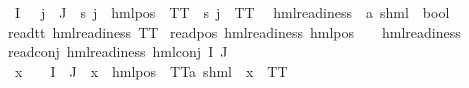 \begin{isabellebody}
\ {\isachardoublequoteopen}I\ {\isacharequal}{\kern0pt}\ {\isacharbraceleft}{\kern0pt}{\isacharbraceright}{\kern0pt}{\isachardoublequoteclose}\ {\isachardoublequoteopen}{\isacharparenleft}{\kern0pt}{\isasymforall}j\ {\isasymin}\ J{\isachardot}{\kern0pt}\ {\isacharparenleft}{\kern0pt}{\isasymexists}{\isasymalpha}{\isachardot}{\kern0pt}\ {\isacharparenleft}{\kern0pt}{\isacharparenleft}{\kern0pt}{\isasympsi}s\ j{\isacharparenright}{\kern0pt}\ {\isacharequal}{\kern0pt}\ hml{\isacharunderscore}{\kern0pt}pos\ {\isasymalpha}\ TT{\isacharparenright}{\kern0pt}{\isacharparenright}{\kern0pt}\ {\isasymor}\ {\isasympsi}s\ j\ {\isacharequal}{\kern0pt}\ TT{\isacharparenright}{\kern0pt}{\isachardoublequoteclose}\ \isanewline
\isanewline
{}\isamarkupfalse%
\ hml{\isacharunderscore}{\kern0pt}readiness\ {\isacharcolon}{\kern0pt}{\isacharcolon}{\kern0pt}\ {\isachardoublequoteopen}{\isacharparenleft}{\kern0pt}{\isacharprime}{\kern0pt}a{\isacharcomma}{\kern0pt}\ {\isacharprime}{\kern0pt}s{\isacharparenright}{\kern0pt}hml\ {\isasymRightarrow}\ bool{\isachardoublequoteclose}\isanewline
\ \ \isanewline
read{\isacharunderscore}{\kern0pt}tt{\isacharcolon}{\kern0pt}\ {\isachardoublequoteopen}hml{\isacharunderscore}{\kern0pt}readiness\ TT{\isachardoublequoteclose}\ {\isacharbar}{\kern0pt}\isanewline
read{\isacharunderscore}{\kern0pt}pos{\isacharcolon}{\kern0pt}\ {\isachardoublequoteopen}hml{\isacharunderscore}{\kern0pt}readiness\ {\isacharparenleft}{\kern0pt}hml{\isacharunderscore}{\kern0pt}pos\ {\isasymalpha}\ {\isasymphi}{\isacharparenright}{\kern0pt}{\isachardoublequoteclose}\ \ {\isachardoublequoteopen}hml{\isacharunderscore}{\kern0pt}readiness\ {\isasymphi}{\isachardoublequoteclose}{\isacharbar}{\kern0pt}\isanewline
read{\isacharunderscore}{\kern0pt}conj{\isacharcolon}{\kern0pt}\ {\isachardoublequoteopen}hml{\isacharunderscore}{\kern0pt}readiness\ {\isacharparenleft}{\kern0pt}hml{\isacharunderscore}{\kern0pt}conj\ I\ J\ {\isasymPhi}{\isacharparenright}{\kern0pt}{\isachardoublequoteclose}\ \isanewline
{}\ {\isachardoublequoteopen}{\isasymforall}x\ {\isasymin}\ {\isacharparenleft}{\kern0pt}{\isasymPhi}\ {\isacharbackquote}{\kern0pt}\ {\isacharparenleft}{\kern0pt}I\ {\isasymunion}\ J{\isacharparenright}{\kern0pt}{\isacharparenright}{\kern0pt}{\isachardot}{\kern0pt}\ {\isacharparenleft}{\kern0pt}{\isasymexists}{\isasymalpha}{\isachardot}{\kern0pt}\ x\ {\isacharequal}{\kern0pt}\ {\isacharparenleft}{\kern0pt}hml{\isacharunderscore}{\kern0pt}pos\ {\isasymalpha}\ TT{\isacharcolon}{\kern0pt}{\isacharcolon}{\kern0pt}{\isacharparenleft}{\kern0pt}{\isacharprime}{\kern0pt}a{\isacharcomma}{\kern0pt}\ {\isacharprime}{\kern0pt}s{\isacharparenright}{\kern0pt}hml{\isacharparenright}{\kern0pt}{\isacharparenright}{\kern0pt}\ {\isasymor}\ x\ {\isacharequal}{\kern0pt}\ TT{\isachardoublequoteclose}\isanewline

\end{isabellebody}
